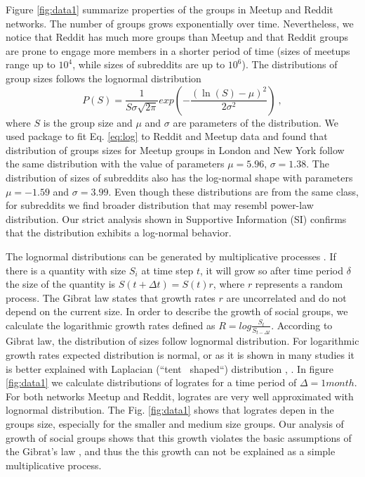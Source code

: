 Figure \ref{fig:data1} summarize properties of the groups in Meetup and Reddit networks. The number of groups grows exponentially over time. Nevertheless, we notice that Reddit has much more groups than Meetup and that Reddit groups are prone to engage more members in a shorter period of time (sizes of meetups range up to  $10^4$, while sizes of subreddits are up to $10^6$). The distributions of group sizes follows the lognormal distribution
\begin{equation}
P(S)=\frac{1}{S\sigma\sqrt{2\pi}}exp(-\frac{(\ln(S)-\mu)^{2}}{2\sigma^{2}})
\label{eq:log} \ ,
\end{equation}
where $S$ is the group size and $\mu$ and $\sigma$ are parameters of the distribution. We used package \cite{powerlaw} to fit Eq. \ref{eq:log} to Reddit and Meetup data and found that distribution of groups sizes for Meetup groups in London and New York follow the same distribution with the value of parameters $\mu= 5.96$, $\sigma = 1.38$. The distribution of sizes of subreddits also has the log-normal shape with parameters $\mu= -1.59$ and $\sigma = 3.99$. Even though these distributions are from the same class, for subreddits we find broader distribution that may resembl power-law distribution. Our strict analysis shown in Supportive Information (SI) confirms that the distribution exhibits a log-normal behavior.  

The lognormal distributions can be generated by multiplicative processes \cite{mitzenmacher2004brief}. If there is a quantity with size $S_i$ at time step $t$, it will grow so after time period $\delta$ the size of the quantity is $S(t+\Delta t) = S(t) r$, where $r$ represents a random process. The Gibrat law states that growth rates $r$ are uncorrelated and do not depend on the current size. In order to describe the growth of social groups, we calculate the logarithmic growth rates defined as $R = log\frac{S_t}{S_{t-\Delta t}}$. According to Gibrat law, the distribution of sizes follow lognormal distribution. For logarithmic growth rates expected distribution is normal, or as it is shown in many studies it is better explained with Laplacian (“tent  shaped“) distribution \cite{mondani2014fat}, \cite{fu2005growth}. In figure \ref{fig:data1} we calculate distributions of logrates for a time period of $\Delta=1 month$. For both networks Meetup and Reddit, logrates are very well approximated with lognormal distribution. The Fig. \ref{fig:data1} shows that logrates depen in the groups size, especially for the smaller and medium size groups. Our analysis of growth of social groups shows that this growth violates the basic assumptions of the Gibrat's law \cite{frasco2014spatially, qian2014origin}, and thus the this growth can not be explained as a simple multiplicative process.\\

